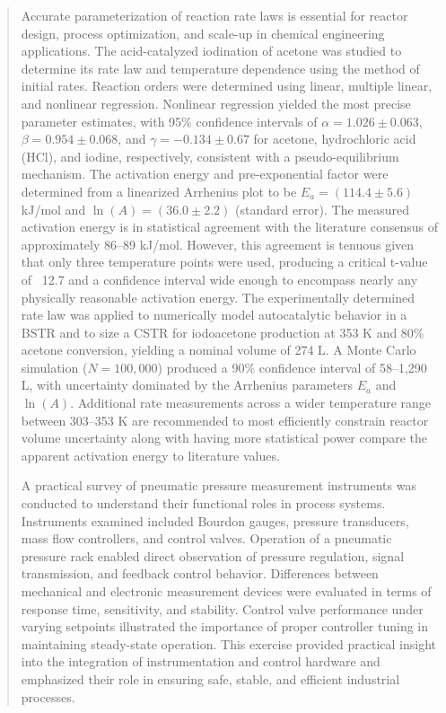 \begin{abstract}
Accurate parameterization of reaction rate laws is essential for reactor design,  process optimization, and scale-up in chemical engineering applications. The  acid-catalyzed iodination of acetone was studied to determine its rate law and temperature dependence using the method of initial rates. Reaction orders were determined using linear, multiple linear, and nonlinear regression. Nonlinear regression yielded the most precise parameter estimates, with 95\% confidence intervals of $\alpha = 1.026 \pm 0.063$, $\beta = 0.954 \pm 0.068$, and $\gamma = -0.134 \pm 0.67$ for acetone, hydrochloric acid (HCl), and iodine, respectively, consistent with a pseudo-equilibrium mechanism. The activation energy and pre-exponential factor were determined from a linearized Arrhenius plot to be $E_a = (114.4 \pm 5.6)$ kJ/mol and $\ln(A) = (36.0 \pm 2.2)$ (standard error). The measured activation energy is in statistical agreement with the literature consensus of approximately 86--89 kJ/mol. However, this agreement is tenuous given that only three temperature points were used, producing a critical t-value of ~12.7 and a confidence interval wide enough to encompass nearly any physically reasonable activation energy.  The experimentally determined rate law was applied to numerically model autocatalytic behavior in a BSTR and to size a CSTR for iodoacetone production at 353 K and 80\% acetone conversion, yielding a nominal volume of 274 L. A Monte Carlo simulation ($N = 100{,}000$) produced a 90\% confidence interval of 58--1,290 L, with uncertainty dominated by the Arrhenius parameters $E_a$ and $\ln(A)$. Additional rate measurements across a wider temperature range between 303--353 K are recommended to most efficiently constrain reactor volume uncertainty along with having more statistical power compare the apparent activation energy to literature values.
\vspace{1em}

A practical survey of pneumatic pressure measurement instruments was conducted to understand their functional roles in process systems. Instruments examined included Bourdon gauges, pressure transducers, mass flow controllers, and control valves. Operation of a pneumatic pressure rack enabled direct observation of pressure regulation, signal transmission, and feedback control behavior. Differences between mechanical and electronic measurement devices were evaluated in terms of response time, sensitivity, and stability. Control valve performance under varying setpoints illustrated the importance of proper controller tuning in maintaining steady-state operation. This exercise provided practical insight into the integration of instrumentation and control hardware and emphasized their role in ensuring safe, stable, and efficient industrial processes.


\end{abstract}